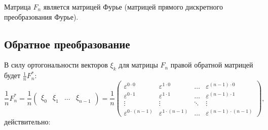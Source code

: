 Матрица $F_n$ является матрицей Фурье (матрицей прямого дискретного преобразования Фурье).

\subsection{Обратное преобразование}

В силу ортогональности векторов $\xi_k$ для матрицы $F_n$ правой обратной матрицей будет $\frac{1}{n} F_n^*$:
\[
    \frac{1}{n} F_n^*
    =
    \frac{1}{n}
    \begin{pmatrix}
        \xi_0 & \xi_1 & \dots & \xi_{n-1}
    \end{pmatrix}
    =
    \frac{1}{n}
    \begin{pmatrix}
        \varepsilon^{0 \cdot 0}     & \varepsilon^{1 \cdot 0}     & \dots  & \varepsilon^{(n-1) \cdot 0}     \\
        \varepsilon^{0 \cdot 1}     & \varepsilon^{1 \cdot 1}     & \dots  & \varepsilon^{(n-1) \cdot 1}     \\
        \vdots                      & \vdots                      & \ddots & \vdots                          \\
        \varepsilon^{0 \cdot (n-1)} & \varepsilon^{1 \cdot (n-1)} & \dots  & \varepsilon^{(n-1) \cdot (n-1)}
    \end{pmatrix}
    ,
\]
действительно:
